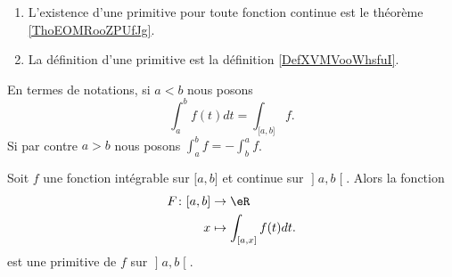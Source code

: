 \begin{enumerate}
    \item
        L'existence d'une primitive pour toute fonction continue est le théorème \ref{ThoEOMRooZPUfJg}.
    \item
        La définition d'une primitive est la définition \ref{DefXVMVooWhsfuI}.
\end{enumerate}

En termes de notations, si \( a<b\) nous posons
\begin{equation}
    \int_a^bf(t)dt=\int_{\mathopen[ a , b \mathclose]}f.
\end{equation}
Si par contre \( a>b\) nous posons \( \int_a^bf=-\int_b^af\).

\begin{proposition} \label{PropEZFRsMj}
    Soit \( f\) une fonction intégrable sur \( \mathopen[ a , b \mathclose]\) et continue sur \( \mathopen] a , b \mathclose[\). Alors la fonction
    \begin{equation}
        \begin{aligned}
            F\colon \mathopen[ a , b \mathclose]&\to \eR \\
            x&\mapsto \int_{\mathopen[ a , x \mathclose]}f(t)dt.
        \end{aligned}
    \end{equation}
est une primitive de \( f\) sur \( \mathopen] a , b \mathclose[\).
\end{proposition}

